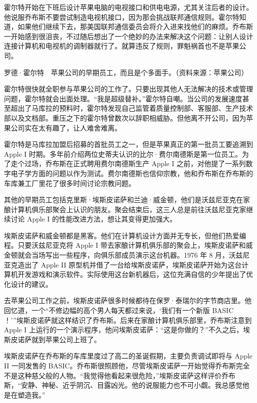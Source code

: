 \documentclass[12pt,UTF8]{ctexbook}
\begin{document}
霍尔特开始在下班后设计苹果电脑的电视接口和供电电源，尤其关注后者的设计。他说服乔布斯不要尝试制造电视机接口，因为那会挑战联邦通信规则。霍尔特知道，如果他们继续下去，那美国联邦通信委员会将介入进来找他们的麻烦。乔布斯一开始感到很沮丧，不过随后想出了一个绝妙的办法来解决这个问题：让别人设计连接计算机和电视机的调制器就行了。就算违反了规则，罪魁祸首也不是苹果公司。



罗德·霍尔特　苹果公司的早期员工，而且是个多面手。（资料来源：苹果公司）

霍尔特很快就全职参与苹果公司的工作了。只要出现其他人无法解决的技术或管理问题，霍尔特就会出面处理。“我是超级替补。”霍尔特自嘲。当公司的发展速度甚至超出了马库拉的预料时，霍尔特发现自己监管着质量控制部、客服部、生产技术部以及文档部。重压之下的霍尔特曾数次以辞职相威胁。但他离不开公司，因为苹果公司实在太有趣了，让人难舍难离。

霍尔特是马库拉加盟后招募的首批员工之一，但是苹果真正的第一批员工要追溯到 Apple I 时期。多年前介绍两位史蒂夫认识的比尔·费尔南德斯是第一位员工。为了走个过场，乔布斯在正式聘用费尔南德斯生产 Apple I 之前，对他提了一系列数字电子学方面的问题以作为测试。费尔南德斯也信仰宗教，他和乔布斯在乔布斯的车库兼工厂里花了很多时间讨论宗教问题。

其他的早期员工包括克里斯·埃斯皮诺萨和兰迪·威金顿，他们是沃兹尼亚克在家酿计算机俱乐部聚会上认识的朋友。聚会结束后，这三人总是前往沃兹尼亚克家继续讨论 Apple I 的性能改进方法，想让其变得更加强大。

埃斯皮诺萨和威金顿都是黑客。他们在计算机设计方面并无专长，但他们热爱编程。只要沃兹尼亚克将 Apple I 带去家酿计算机俱乐部的聚会上，埃斯皮诺萨和威金顿就会当场写出一些程序，向俱乐部成员演示这台机器。1976 年 8 月，沃兹尼亚克造出了 Apple II 原型机并借了一台给埃斯皮诺萨，埃斯皮诺萨开始为这台计算机开发游戏和演示软件。实际使用这台新机器后，这位充满自信的少年提出了优化设计的建议。

去苹果公司工作之前，埃斯皮诺萨很多时候都待在保罗·泰瑞尔的字节商店里。他回忆道，一个“不修边幅的高个男人每天都过来说，‘我们有一个新版 BASIC ！’”埃斯皮诺萨就这样结识了乔布斯。后来在家酿计算机俱乐部里，乔布斯注意到 Apple I 上运行的一个演示程序，他问埃斯皮诺萨：“这是你做的？”不久之后，埃斯皮诺萨就到苹果公司上班了。

埃斯皮诺萨在乔布斯的车库里度过了高二的圣诞假期，主要负责调试即将与 Apple II 一同发售的 BASIC。乔布斯很照顾他，尽管埃斯皮诺萨一开始觉得乔布斯完全不是这种慈父般的人物。“我觉得他看起来很危险，”埃斯皮诺萨这样评价乔布斯，“安静、神秘、近乎阴沉、目露凶光。他的说服能力也不可小觑。我总感觉他是在塑造我。”
\end{document}
